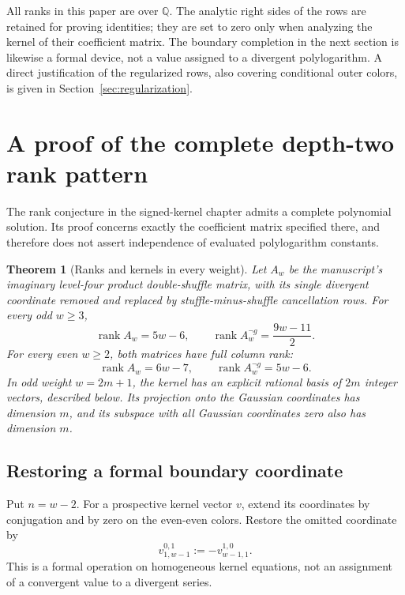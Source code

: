 \documentclass[11pt]{article}
\numberwithin{equation}{section}
\theoremstyle{plain}
\newtheorem{theorem}{Theorem}[section]
\theoremstyle{definition}
\theoremstyle{remark}
\newcommand{\Q}{\mathbb Q}
\begin{document}
All ranks in this paper are over $\Q$. The analytic right sides of
the rows are retained for proving identities; they are set to zero
only when analyzing the kernel of their coefficient matrix. The
boundary completion in the next section is likewise a formal device,
not a value assigned to a divergent polylogarithm. A direct justification
of the regularized rows, also covering conditional outer colors, is
given in Section~\ref{sec:regularization}.

\section{A proof of the complete depth-two rank pattern}

The rank conjecture in the signed-kernel chapter admits a complete
polynomial solution. Its proof concerns exactly the coefficient matrix
specified there, and therefore does not assert independence of evaluated
polylogarithm constants.

\begin{theorem}[Ranks and kernels in every weight]\label{rank:thm:all}
Let $A_w$ be the manuscript's imaginary level-four product double-shuffle
matrix, with its single divergent coordinate removed and replaced by
stuffle-minus-shuffle cancellation rows. For every odd $w\ge3$,
\[
 \operatorname{rank}A_w=5w-6,\qquad
 \operatorname{rank}A_w^{\neg g}=\frac{9w-11}{2}.
\]
For every even $w\ge2$, both matrices have full column rank:
\[
 \operatorname{rank}A_w=6w-7,\qquad
 \operatorname{rank}A_w^{\neg g}=5w-6.
\]
In odd weight $w=2m+1$, the kernel has an explicit rational basis of
$2m$ integer vectors, described below. Its projection onto the Gaussian
coordinates has dimension $m$, and its subspace with all Gaussian
coordinates zero also has dimension $m$.
\end{theorem}

\subsection{Restoring a formal boundary coordinate}
Put $n=w-2$. For a prospective kernel vector $v$, extend its coordinates
by conjugation and by zero on the even-even colors. Restore the omitted
coordinate by
\[
 v^{0,1}_{1,w-1}:=-v^{1,0}_{w-1,1}.
\]
This is a formal operation on homogeneous kernel equations, not an
assignment of a convergent value to a divergent series.
\end{document}
